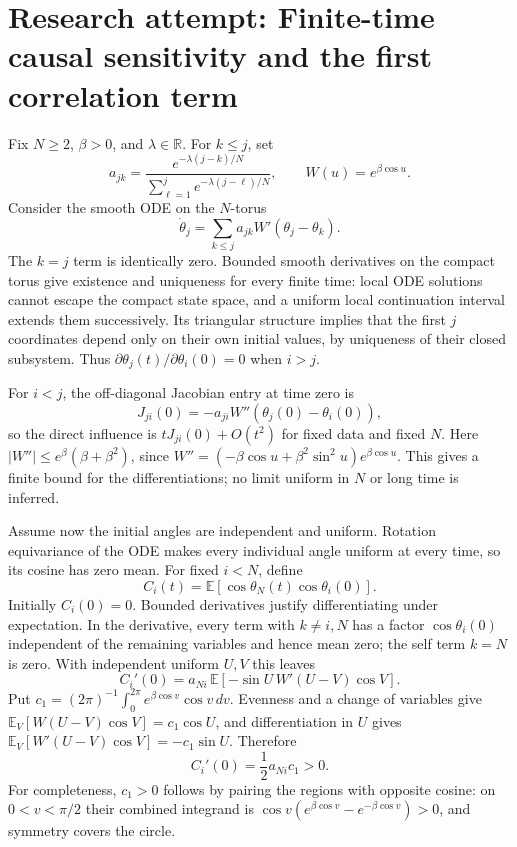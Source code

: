 \documentclass[11pt]{article}
\begin{document}
\section{Research attempt: Finite-time causal sensitivity and the first correlation term}

Fix $N\geq2$, $\beta>0$, and $\lambda\in\mathbb R$. For $k\leq j$, set
\[
a_{jk}=\frac{e^{-\lambda(j-k)/N}}{\sum_{\ell=1}^j e^{-\lambda(j-\ell)/N}},
\qquad W(u)=e^{\beta\cos u}.
\]
Consider the smooth ODE on the $N$-torus
\[
\dot\theta_j=\sum_{k\leq j}a_{jk}W'(\theta_j-\theta_k).
\]
The $k=j$ term is identically zero. Bounded smooth derivatives on the compact torus give existence and uniqueness for every finite time: local ODE solutions cannot escape the compact state space, and a uniform local continuation interval extends them successively. Its triangular structure implies that the first $j$ coordinates depend only on their own initial values, by uniqueness of their closed subsystem. Thus $\partial\theta_j(t)/\partial\theta_i(0)=0$ when $i>j$.

For $i<j$, the off-diagonal Jacobian entry at time zero is
\[
J_{ji}(0)=-a_{ji}W''(\theta_j(0)-\theta_i(0)),
\]
so the direct influence is $tJ_{ji}(0)+O(t^2)$ for fixed data and fixed $N$. Here $|W''|\leq e^\beta(\beta+\beta^2)$, since $W''=(-\beta\cos u+\beta^2\sin^2u)e^{\beta\cos u}$. This gives a finite bound for the differentiations; no limit uniform in $N$ or long time is inferred.

Assume now the initial angles are independent and uniform. Rotation equivariance of the ODE makes every individual angle uniform at every time, so its cosine has zero mean. For fixed $i<N$, define
\[
C_i(t)=\mathbb E[\cos\theta_N(t)\cos\theta_i(0)].
\]
Initially $C_i(0)=0$. Bounded derivatives justify differentiating under expectation. In the derivative, every term with $k\ne i,N$ has a factor $\cos\theta_i(0)$ independent of the remaining variables and hence mean zero; the self term $k=N$ is zero. With independent uniform $U,V$ this leaves
\[
C_i'(0)=a_{Ni}\,\mathbb E[-\sin U\,W'(U-V)\cos V].
\]
Put $c_1=(2\pi)^{-1}\int_0^{2\pi}e^{\beta\cos v}\cos v\,dv$. Evenness and a change of variables give $\mathbb E_V[W(U-V)\cos V]=c_1\cos U$, and differentiation in $U$ gives $\mathbb E_V[W'(U-V)\cos V]=-c_1\sin U$. Therefore
\[
C_i'(0)=\frac12a_{Ni}c_1>0.
\]
For completeness, $c_1>0$ follows by pairing the regions with opposite cosine: on $0<v<\pi/2$ their combined integrand is $\cos v(e^{\beta\cos v}-e^{-\beta\cos v})>0$, and symmetry covers the circle.
\end{document}
